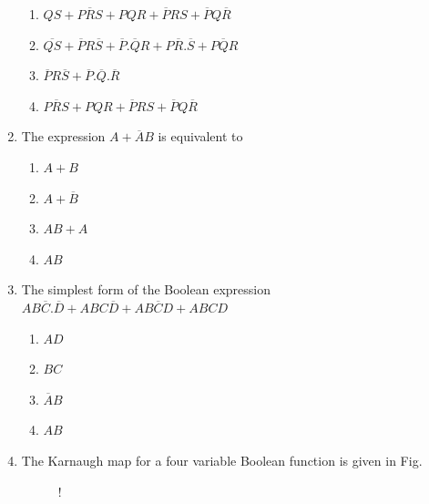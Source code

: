 \documentclass[journal,12pt,twocolumn]{IEEEtran}
\begin{document}
\begin{enumerate}
                        \begin{enumerate}
      \item $QS+P\overline{R}S+PQR+\overline{P}RS+\overline{P}Q\overline{R}$ 
      \item $\overline{QS}+\overline{P}R\overline{S}+\overline{P}.\overline{Q}R+P\overline{R}.\overline{S}+P\overline{Q}R$
      \item $\overline{P}R\overline{S}+\overline{P}.\overline{Q}.\overline{R}$
      \item $P\overline{R}S+PQR+\overline{P}RS+\overline{P}Q\overline{R}$
    \end{enumerate}
    \item The expression $A+\overline{A}B$ is equivalent to
     \begin{enumerate}
      \item $A+B$ 
      \item $A+\overline{B}$
      \item $AB+A$
      \item $AB$
    \end{enumerate}
    \item The simplest form of the Boolean expression $AB\overline{C}.\overline{D}+ABC\overline{D}+AB\overline{C}D+ABCD$
    \begin{enumerate}
      \item $AD$ 
      \item $BC$
      \item $\overline{A}B$
      \item $AB$
    \end{enumerate}
    \item The Karnaugh map for a four variable Boolean function is given in Fig.
\begin{figure}[!h]
\centering
\resizebox {\columnwidth} {!} {

}
\caption{}
\end{figure}
            

\end{enumerate}
\end{document}
